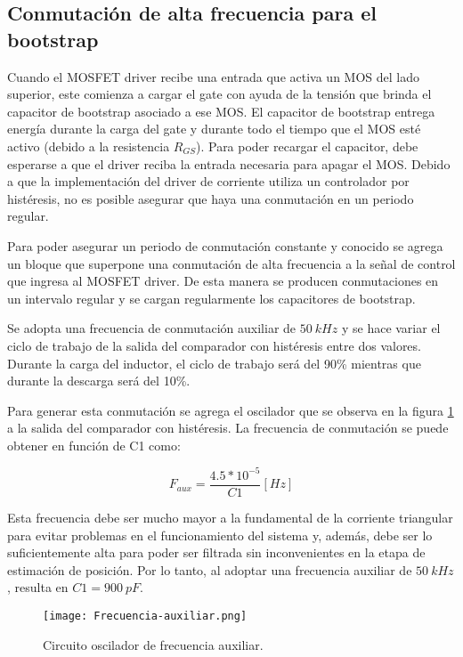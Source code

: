\subsection{Conmutación de alta frecuencia para el bootstrap}

\noindent Cuando el MOSFET driver recibe una entrada que activa un MOS del lado superior, este comienza a cargar el gate con ayuda de la tensión que brinda el capacitor de bootstrap asociado a ese MOS. El capacitor de bootstrap entrega energía durante la carga del gate y durante todo el tiempo que el MOS esté activo (debido a la resistencia $R_{GS}$). Para poder recargar el capacitor, debe esperarse a que el driver reciba la entrada necesaria para apagar el MOS. Debido a que la implementación del driver de corriente utiliza un controlador por histéresis, no es posible asegurar que haya una conmutación en un periodo regular.

\noindent Para poder asegurar un periodo de conmutación constante y conocido se agrega un bloque que superpone una conmutación de alta frecuencia a la señal de control que ingresa al MOSFET driver. De esta manera se producen conmutaciones en un intervalo regular y se cargan regularmente los capacitores de bootstrap. 

\noindent Se adopta una frecuencia de conmutación auxiliar de $50\:kHz$ y se hace variar el ciclo de trabajo de la salida del comparador con histéresis entre dos valores. Durante la carga del inductor, el ciclo de trabajo será del 90\% mientras que durante la descarga será del 10\%.

\noindent Para generar esta conmutación se agrega el oscilador que se observa en la figura \ref{fig:img_frecuencia-auxiliar} a la salida del comparador con histéresis. La frecuencia de conmutación se puede obtener en función de C1 como:

\begin{equation} 
	F_{aux} = \frac{4.5*10^{-5}}{C1} [Hz]
\end{equation}


\noindent Esta frecuencia debe ser mucho mayor a la fundamental de la corriente triangular para evitar problemas en el funcionamiento del sistema y, además, debe ser lo suficientemente alta para poder ser filtrada sin inconvenientes en la etapa de estimación de posición. Por lo tanto, al adoptar una frecuencia auxiliar de $50\:kHz$, resulta en $C1= 900 \:pF$.

\begin{figure}[H]
	\centering
	\texttt{[image: Frecuencia-auxiliar.png]}
	\caption{Circuito oscilador de frecuencia auxiliar.}
	\label{fig:img_frecuencia-auxiliar}
\end{figure}


